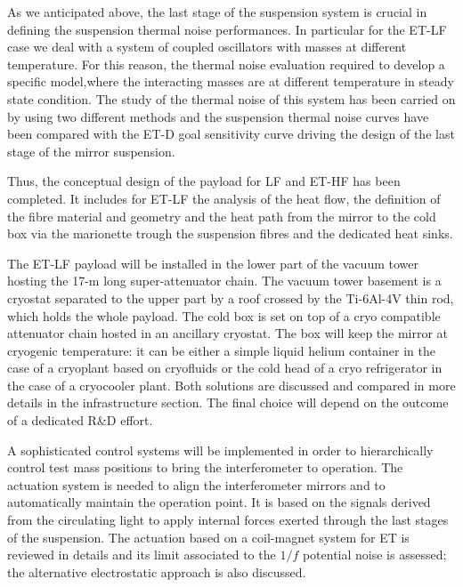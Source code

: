 \medskip

As we anticipated above, the last stage of the suspension system is crucial in defining 
the suspension thermal noise performances. In particular for the  ET-LF case we deal 
with a system of coupled oscillators with masses at different temperature. For this reason, 
the thermal noise evaluation required to develop a specific model,where
the interacting masses are at different  temperature in steady state condition. 
The study of the thermal noise 
of this system has been carried on by using two different methods and the suspension 
thermal noise curves have been compared with the ET-D goal sensitivity curve driving 
the design of the last stage of the mirror suspension. 

Thus, the conceptual design of the payload for LF and  ET-HF has been completed. 
It includes for  ET-LF the analysis of the heat flow, the definition of the fibre 
material and geometry and the heat path from the mirror to the cold box via the 
marionette trough the suspension fibres and the dedicated heat sinks.

\medskip

The  ET-LF payload will be installed in the lower part of the vacuum tower hosting 
the 17-m long super-attenuator chain. The vacuum tower basement is a cryostat separated 
to the upper part by a roof crossed by the Ti-6Al-4V thin rod, which holds the 
whole payload. The cold box is set on top of a cryo 
compatible attenuator chain hosted in an ancillary cryostat. The box will keep the mirror at cryogenic temperature: 
it can be either a simple liquid helium container in the case of a cryoplant based 
on cryofluids or the cold head of a cryo refrigerator in the case of a cryocooler 
plant. Both solutions are discussed and compared in more details in the infrastructure 
section. The final choice will depend on the outcome of a dedicated  R\&D effort.

\medskip

A sophisticated control systems will be implemented in order to hierarchically 
control test mass positions to bring the interferometer to operation.
The actuation system is needed to align the interferometer mirrors 
and to automatically maintain the operation point. It is based on the signals 
derived from the circulating light  to apply internal forces exerted 
through the last stages of the suspension. 
The actuation based on a coil-magnet system for ET is reviewed in details and 
its limit associated to the $1/f$ potential noise is assessed; the alternative 
electrostatic approach is also discussed.

